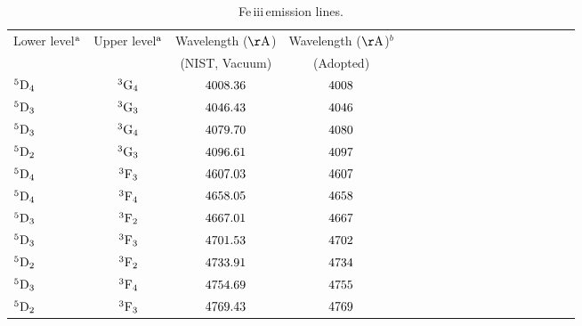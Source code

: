 \documentclass{emulateapj}
\newcommand\fe{Fe\,{\sc iii}\,}
\begin{document}
\newpage
\begin{table*}
\centering
\caption{  \fe emission lines.} \label{Table:atomic-data}
  \begin{tabular}{lccccccccccccccccc} \hline\hline 

  Lower level$\rm ^a$	& Upper level$\rm ^a$ 	& Wavelength ($\rm \AA$) & Wavelength ($\rm \AA$)$^b$	\\
			&			& (NIST, Vacuum) 	& (Adopted)	  \\  \hline 
$\rm ^5D_4$		&$\rm ^3G_4$	&  $\rm 4008.36$   &  $\rm 4008$   			&\\                                         
$\rm ^5D_3$		&$\rm ^3G_3$	&  $\rm 4046.43$   &  $\rm 4046$   			&\\                                         
$\rm ^5D_3$		&$\rm ^3G_4$	&  $\rm 4079.70$   &  $\rm 4080$   			&\\                                         
$\rm ^5D_2$		&$\rm ^3G_3$	&  $\rm 4096.61$   &  $\rm 4097$     		&\\ 
$\rm ^5D_4$		&$\rm ^3F_3$	&  $\rm 4607.03$   &  $\rm 4607$   			&\\     
$\rm ^5D_4$		&$\rm ^3F_4$	&  $\rm 4658.05$   &  $\rm 4658$   			&\\ 
$\rm ^5D_3$		&$\rm ^3F_2$	&  $\rm 4667.01$   &  $\rm 4667$     		&\\      
                                                                           
 $\rm ^5D_3$		&$\rm ^3F_3$	&  $\rm 4701.53$   &  $\rm 4702$   			&\\                                         
                                                                           
$\rm ^5D_2$		&$\rm ^3F_2$	&  $\rm 4733.91$   &  $\rm 4734$   			&\\
                                                                           
$\rm ^5D_3$		&$\rm ^3F_4$	&  $\rm 4754.69$   &  $\rm 4755$     		&\\                                                
	                                                                   
$\rm ^5D_2$		&$\rm ^3F_3$	&  $\rm 4769.43$   &  $\rm 4769$   			&\\                                         
	                                                                   

\end{tabular}
\end{table*}
\end{document}
